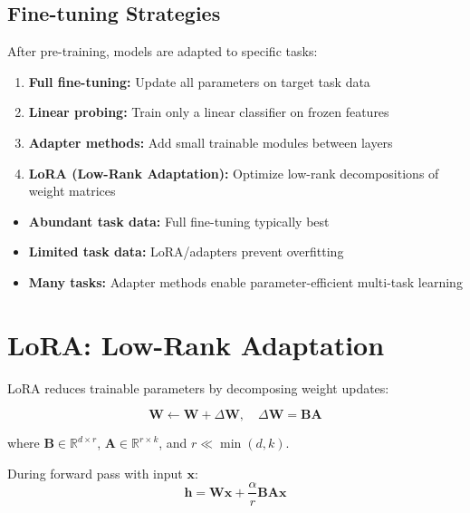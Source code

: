\subsection{Fine-tuning Strategies}

After pre-training, models are adapted to specific tasks:

\begin{enumerate}
    \item \textbf{Full fine-tuning:} Update all parameters on target task data
    \item \textbf{Linear probing:} Train only a linear classifier on frozen features
    \item \textbf{Adapter methods:} Add small trainable modules between layers
    \item \textbf{LoRA (Low-Rank Adaptation):} Optimize low-rank decompositions of weight matrices
\end{enumerate}

\begin{note}
\begin{itemize}
    \item \textbf{Abundant task data:} Full fine-tuning typically best
    \item \textbf{Limited task data:} LoRA/adapters prevent overfitting
    \item \textbf{Many tasks:} Adapter methods enable parameter-efficient multi-task learning
\end{itemize}
\end{note}

\section{LoRA: Low-Rank Adaptation}

LoRA \cite{hu2021lora} reduces trainable parameters by decomposing weight updates:

\begin{equation}
\mathbf{W} \leftarrow \mathbf{W} + \Delta\mathbf{W}, \quad \Delta\mathbf{W} = \mathbf{B}\mathbf{A}
\end{equation}

where $\mathbf{B} \in \mathbb{R}^{d \times r}$, $\mathbf{A} \in \mathbb{R}^{r \times k}$, and $r \ll \min(d, k)$.

During forward pass with input $\mathbf{x}$:
\begin{equation}
\mathbf{h} = \mathbf{W}\mathbf{x} + \frac{\alpha}{r}\mathbf{B}\mathbf{A}\mathbf{x}
\end{equation}

